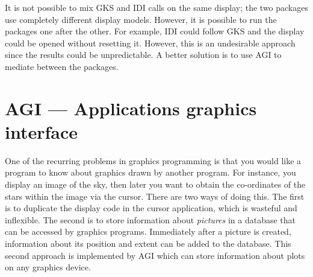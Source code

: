 It is not possible to mix GKS and IDI calls on the same display; the two
packages use completely different display models.
However, it is possible to run the packages one after the other.
For example, IDI could follow GKS and the display could be opened without
resetting it.
However, this is an undesirable approach since the results could be
unpredictable.
A better solution is to use AGI to mediate between the packages.

\section{AGI --- Applications graphics interface}

One of the recurring problems in graphics programming is that you would
like a program to know about graphics drawn by another program.
For instance, you display an image of the sky, then later you want to obtain
the co-ordinates of the stars within the image via the cursor.
There are two ways of doing this.
The first is to duplicate the display code in the cursor application, which is
wasteful and inflexible.
The second is to store information about {\em pictures} in a database that can
be accessed by graphics programs.
Immediately after a picture is created, information about its position and
extent can be added to the database.
This second approach is implemented by AGI which can store information about
plots on any graphics device.

